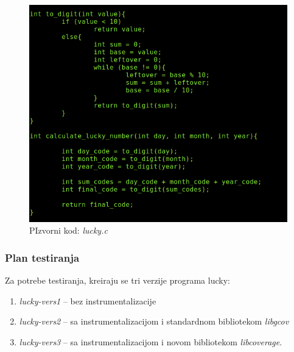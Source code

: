 \documentclass[12pt,oneside]{memoir}
\newcommand{\strano}[1]{\textit{#1}}
\begin{document}
\begin{figure}[!ht]
  \centering
  \includegraphics[width=\textwidth]{img/lucky.png}
  \caption{PIzvorni kod: \strano{lucky.c}}
  \label{fig:lucky2}
\end{figure}

\subsubsection{Plan testiranja}

Za potrebe testiranja, kreiraju se tri verzije programa lucky:
\begin{enumerate}
\item \strano{lucky-vers1} – bez instrumentalizacije
\item \strano{lucky-vers2} – sa instrumentalizacijom i standardnom bibliotekom \strano{libgcov}
\item \strano{lucky-vers3} – sa instrumentalizacijom i novom bibliotekom \strano{libcoverage}. 
\end{enumerate}
\end{document}
